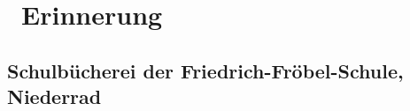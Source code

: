 \documentclass[
	version=last,
	fontsize=12pt,
	DIV=20,
	parskip=half,
	twoside=semi,
	sfdefaults=true,
	usegeometry
]{scrartcl}
\begin{document}
\section*{\makebox[1em]{\normalsize\textcolor{gray}{\dotfill}}~Erinnerung}
\vspace*{-1ex}
\subsection*{Schulbücherei der Friedrich-Fröbel-Schule, Niederrad}


\end{document}
